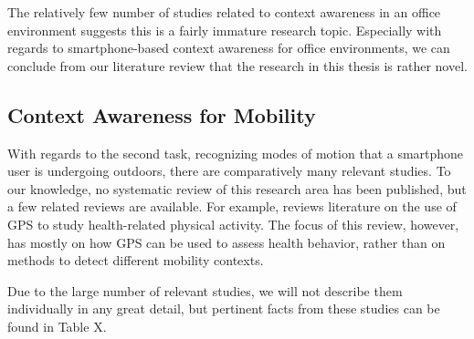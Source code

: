 The relatively few number of studies related to context awareness in an office environment suggests this is a fairly immature research topic. Especially with regards to smartphone-based context awareness for office environments, we can conclude from our literature review that the research in this thesis is rather novel.
%
\subsection{Context Awareness for Mobility}
\label{sec:mobility-context-literature}

With regards to the second task, recognizing modes of motion that a smartphone user is undergoing outdoors, there are comparatively many relevant studies. To our knowledge, no systematic review of this research area has been published, but a few related reviews are available. For example, \cite{Duncan2009} reviews literature on the use of GPS to study health-related physical activity. The focus of this review, however, has mostly on how GPS can be used to assess health behavior, rather than on methods to detect different mobility contexts.

Due to the large number of relevant studies, we will not describe them individually in any great detail, but pertinent facts from these studies can be found in Table X.

